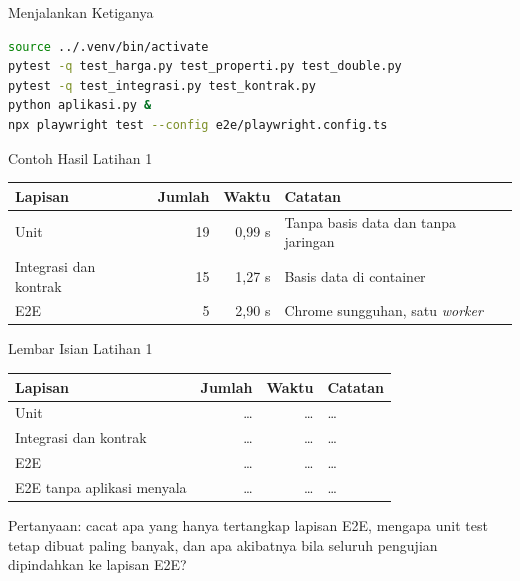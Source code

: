 \documentclass[aspectratio=169, table, 12pt]{beamer}
\begin{document}
\begin{frame}[fragile]{{\Large Menjalankan Ketiganya}}
  \vspace{2pt}
\begin{lstlisting}[language=bash]
source ../.venv/bin/activate
pytest -q test_harga.py test_properti.py test_double.py
pytest -q test_integrasi.py test_kontrak.py
python aplikasi.py &
npx playwright test --config e2e/playwright.config.ts
\end{lstlisting}
\end{frame}

\begin{frame}{{\Large Contoh Hasil Latihan 1}}
  \vspace{6pt}
  \centering
  {\footnotesize
  \begin{tabularx}{\textwidth}{lrrY}
    \hline
    \textbf{Lapisan} & \textbf{Jumlah} & \textbf{Waktu} & \textbf{Catatan} \\
    \hline
    Unit & 19 & 0,99 s & Tanpa basis data dan tanpa jaringan \\
    \hline
    Integrasi dan kontrak & 15 & 1,27 s & Basis data di container \\
    \hline
    E2E & 5 & 2,90 s & Chrome sungguhan, satu \textit{worker} \\
    \hline
  \end{tabularx}}
\end{frame}

\begin{frame}{{\Large Lembar Isian Latihan 1}}
  \vspace{4pt}
  \centering
  {\footnotesize
  \begin{tabularx}{\textwidth}{lrrY}
    \hline
    \textbf{Lapisan} & \textbf{Jumlah} & \textbf{Waktu} & \textbf{Catatan} \\
    \hline
    Unit & \dots & \dots & \dots \\
    \hline
    Integrasi dan kontrak & \dots & \dots & \dots \\
    \hline
    E2E & \dots & \dots & \dots \\
    \hline
    E2E tanpa aplikasi menyala & \dots & \dots & \dots \\
    \hline
  \end{tabularx}}

  \vspace{6pt}
  {\footnotesize Pertanyaan: cacat apa yang hanya tertangkap lapisan E2E,
  mengapa unit test tetap dibuat paling banyak, dan apa akibatnya bila
  seluruh pengujian dipindahkan ke lapisan E2E?}
\end{frame}
\end{document}
